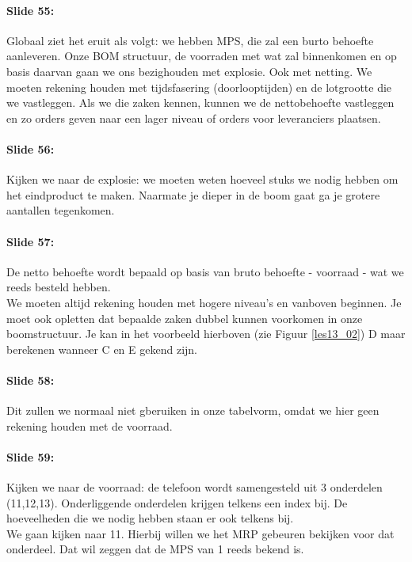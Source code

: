 \documentclass[10pt,a4paper]{report}
\begin{document}
\paragraph{Slide 55:} Globaal ziet het eruit als volgt: we hebben MPS, die zal een burto behoefte aanleveren. Onze BOM structuur, de voorraden met wat zal binnenkomen en op basis  daarvan gaan we ons bezighouden met explosie. Ook met netting. We moeten rekening houden met tijdsfasering (doorlooptijden) en de lotgrootte die we vastleggen. Als we die zaken kennen, kunnen we de nettobehoefte vastleggen en zo orders geven naar een lager niveau of orders voor leveranciers plaatsen. 

\paragraph{Slide 56:} Kijken we naar de explosie: we moeten weten hoeveel stuks we nodig hebben om het eindproduct te maken. Naarmate je dieper in de boom gaat ga je grotere aantallen tegenkomen. 

\paragraph{Slide 57:} De netto behoefte wordt bepaald op basis van bruto behoefte - voorraad - wat we reeds besteld hebben.\\
We moeten altijd rekening houden met hogere niveau's en vanboven beginnen. Je moet ook opletten dat bepaalde zaken dubbel kunnen voorkomen in onze boomstructuur. Je kan in het voorbeeld hierboven (zie Figuur \ref{les13_02}) D maar berekenen wanneer C en E gekend zijn. 

\paragraph{Slide 58:} Dit zullen we normaal niet gberuiken in onze tabelvorm, omdat we hier geen rekening houden met de voorraad. 

\paragraph{Slide 59:} Kijken we naar de voorraad: de telefoon wordt samengesteld uit 3 onderdelen (11,12,13). Onderliggende onderdelen krijgen telkens een index bij. De hoeveelheden die we nodig hebben staan er ook telkens bij.\\
We gaan kijken naar 11. Hierbij willen we het MRP gebeuren bekijken voor dat onderdeel. Dat wil zeggen dat de MPS van 1 reeds bekend is.
\end{document}
